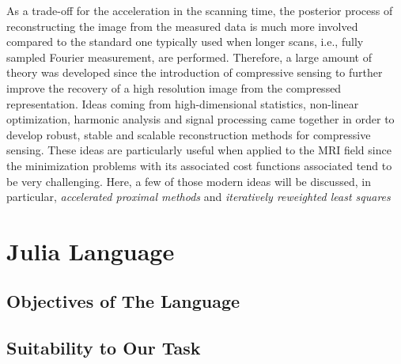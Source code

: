 
As a trade-off for the acceleration in the scanning time, the posterior process of reconstructing the image from the measured data is much more involved compared to the standard one typically used when longer scans, i.e., fully sampled Fourier measurement, are performed. Therefore, a large amount of theory was developed since the introduction of compressive sensing to further improve the recovery of a high resolution image from the compressed representation. Ideas coming from high-dimensional statistics, non-linear optimization, harmonic analysis and signal processing came together in order to develop robust, stable and scalable reconstruction methods for compressive sensing. These ideas are particularly useful when applied to the MRI field since the minimization problems with its associated cost functions associated tend to be very challenging. Here, a few of those modern ideas will be discussed, in particular, \emph{accelerated proximal methods} and \emph{iteratively reweighted least squares}


\section{Julia Language}
\subsection{Objectives of The Language}
\subsection{Suitability to Our Task}

